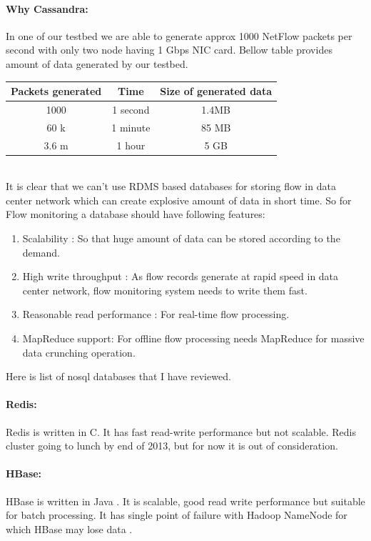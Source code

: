      \paragraph{Why Cassandra:} In one of our testbed we are able to generate approx 1000 NetFlow packets per second with only two node
      having 1 Gbps NIC card. Bellow table provides amount of data generated by our testbed.\\
      \begin{tabular}{ccc}
      \\
      \hline
	  Packets generated& Time & Size of generated data \\
	  \hline
	  1000   & 1 second & 1.4MB\\
	  60 k   & 1 minute & 85 MB\\
	  3.6 m  & 1 hour    &  5 GB\\
      \end{tabular}\\
      It is clear that we can't use RDMS based databases for storing flow in data center network which can create explosive amount of
      data in short time. So for Flow monitoring a database should have following features:
      \begin{enumerate}
       \item Scalability : So that huge amount of data can be stored according to the demand.
       \item High write throughput : As flow records generate at rapid speed in data center network, flow monitoring system needs  to write
	     them fast.
       \item Reasonable read performance : For real-time flow processing.
       \item MapReduce support: For offline flow processing needs MapReduce for massive data crunching operation.
      \end{enumerate}
      
      Here is list of nosql databases that I have reviewed.
      
      \paragraph{Redis:} Redis is written in C. It has fast read-write performance but not scalable. Redis cluster
      going to lunch by end of 2013\cite{rrdcluster}, but for now it is out of consideration. 
      \paragraph{HBase:} HBase is written in Java . It is scalable, good read write performance but suitable for
      batch processing. It has single point of failure with Hadoop NameNode for which HBase may lose data  .  
